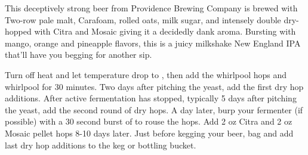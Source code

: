 \documentclass[10pt,oneside]{scrbook}
\begin{document}
\begin{aboutblock}
This deceptively strong beer from Providence Brewing Company is brewed with Two-row pale
malt, Cara\-foam, rolled oats, milk sugar, and intensely double dry-hopped with Citra and
Mosaic giving it a decidedly dank aroma. Bursting with mango, orange and pineapple flavors,
this is a juicy milkshake New England IPA that'll have you begging for another sip.
\end{aboutblock}


\begin{methodandtiming}
 
\begin{mashsteps}
\end{mashsteps}

\begin{fermentationsteps}
\end{fermentationsteps}

\begin{directions}
Turn off heat and let temperature drop to , then add the whirlpool hops and
whirlpool for 30 minutes. Two days after pitching the yeast, add the first dry hop
additions. After active fermentation has stopped, typically 5 days after pitching the
yeast, add the second round of dry hops. A day later, burp your fermenter (if possible)
with a 30 second burst of  to rouse the hops. Add 2 oz Citra and 2 oz Mosaic pellet hops 8-10 days later. Just before kegging your beer, bag and add last dry hop additions to the keg or bottling bucket.
\end{directions}

\end{methodandtiming}

\pagebreak
\end{document}
